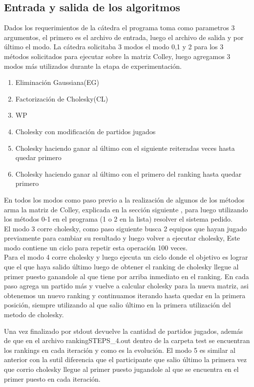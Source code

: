 \subsection{Entrada y salida de los algoritmos}

Dados los requerimientos de la c\'atedra el programa toma como parametros 3 argumentos, el primero es el archivo de entrada, luego el archivo de salida y
por \'ultimo el modo.  La c\'atedra solicitaba 3 modos el modo 0,1 y 2 para los 3 m\'etodos solicitados para ejecutar sobre la matriz Colley, luego agregamos 3 modos m\'as utilizados durante la etapa 
de experimentaci\'on.
\\
\begin{enumerate}
    \item Eliminaci\'on Gaussiana(EG)
    \item Factorizaci\'on de Cholesky(CL)
    \item WP
    \item Cholesky con modificaci\'on de partidos jugados
    \item Cholesky haciendo ganar al \'ultimo con el siguiente reiteradas veces hasta quedar primero
    \item Cholesky haciendo ganar al \'ultimo con el primero del ranking hasta quedar primero
\end{enumerate}
En todos los modos como paso previo a la realizaci\'on de algunos de los m\'etodos arma la matriz de Colley, explicada en la secci\'on siguiente , para luego utilizando los m\'etodos 0-1 en el programa (1 o 2 en la lista) resolver el sistema pedido.
\\

El modo 3 corre cholesky, como paso siguiente busca 2 equipos que hayan jugado previamente para cambiar su resultado y luego volver a ejecutar cholesky,
Este modo contiene un ciclo para repetir esta operaci\'on 100 veces.
\\
Para el modo 4 corre cholesky y luego ejecuta un ciclo donde el objetivo es lograr que el que haya salido \'ultimo luego de obtener el ranking de cholesky llegue al primer puesto ganandole
al que tiene por arriba inmediato en el ranking. En cada paso agrega un partido m\'as y vuelve a calcular cholesky para la nueva matriz, asi obtenemos un nuevo ranking y continuamos iterando hasta quedar en la primera posici\'on,
siempre utilizando al que salio \'ultimo en la primera utilizaci\'on del metodo de cholesky.

Una vez finalizado por stdout devuelve la cantidad de partidos jugados, adem\'as de que en el archivo  rankingSTEPS\_4.out dentro de la carpeta test se encuentran los rankings en cada iteraci\'on y como es la evoluci\'on.
El modo 5 es similar al anterior con la sutil diferencia que el participante que salio \'ultimo la primera vez que corrio cholesky llegue al primer puesto jugandole al que se encuentra en el primer puesto en cada iteraci\'on.

